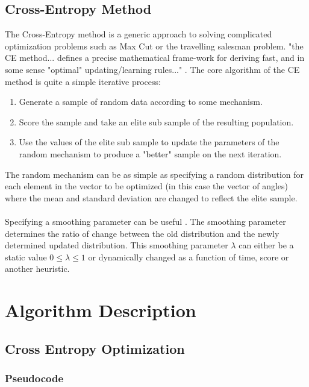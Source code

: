 \documentclass[11pt]{article}
\begin{document}
    \subsection{Cross-Entropy Method}
    The Cross-Entropy method is a generic approach to solving complicated optimization problems such as Max Cut or the travelling salesman problem. "the CE method... defines a precise mathematical frame-work for deriving fast, and in some sense "optimal" updating/learning rules..." \cite{CE}. The core algorithm of the CE method is quite a simple iterative process:
    \begin{enumerate}
        \item Generate a sample of random data according to some mechanism.
        \item Score the sample and take an elite sub sample of the resulting population.
        \item Use the values of the elite sub sample to update the parameters of the random mechanism to produce a "better" sample on the next iteration.
    \end{enumerate}
    The random mechanism can be as simple as specifying a random distribution for each element in the vector to be optimized (in this case the vector of angles) where the mean and standard deviation are changed to reflect the elite sample.
    \\\\
    Specifying a smoothing parameter can be useful \cite{CE2}. The smoothing parameter determines the ratio of change between the old distribution and the newly determined updated distribution. This smoothing parameter $\lambda$ can either be a static value $0 \leq \lambda \leq 1$ or dynamically changed as a function of time, score or another heuristic.

    \clearpage

    \section{Algorithm Description}
    \subsection{Cross Entropy Optimization}
    \subsubsection{Pseudocode}
    
    
    \clearpage
\end{document}
